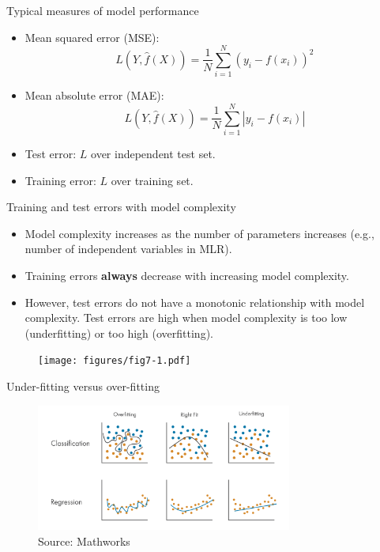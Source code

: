\documentclass[aspectratio=169]{beamer}
\begin{document}
\begin{frame}{Typical measures of model performance}
    \begin{itemize}
        \item Mean squared error (MSE):
            \begin{equation*}
                L(Y, \hat{f}(X)) = \frac{1}{N}\sum_{i=1}^N (y_i - f(x_i))^2
            \end{equation*}
        \item Mean absolute error (MAE):
            \begin{equation*}
                L(Y, \hat{f}(X)) = \frac{1}{N}\sum_{i=1}^N \left| y_i - f(x_i) \right|
            \end{equation*}
        \item Test error: $L$ over independent test set.
        \item Training error: $L$ over training set.
    \end{itemize}
\end{frame}


\begin{frame}{Training and test errors with model complexity}
    \begin{itemize}
        \item Model complexity increases as the number of parameters increases (e.g., number of independent variables in MLR).
        \item Training errors \textbf{always} decrease with increasing model complexity.
        \item However, test errors do not have a monotonic relationship with model complexity. Test errors are high when model complexity is too low (underfitting) or too high (overfitting).
    \end{itemize}
    \begin{figure}
        \centering
        \texttt{[image: figures/fig7-1.pdf]}
    \end{figure}
\end{frame}


\begin{frame}{Under-fitting versus over-fitting}
    \begin{figure}
        \centering
        \includegraphics[width=0.75\textwidth]{figures/under_over_fitting.png}
        \caption{Source: Mathworks}
    \end{figure}
\end{frame}
\end{document}
